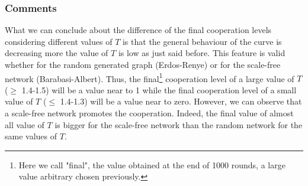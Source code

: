 \documentclass{article}
\begin{document}
\subsubsection{Comments}
What we can conclude about the difference of the final cooperation levels considering different values of $T$ is that the general behaviour of the curve is decreasing more the value of $T$ is low as just said before. This feature is valid whether for the random generated graph (Erdos-Renye) or for the scale-free network (Barabasi-Albert). Thus, the final\footnote{Here we call "final", the value obtained at the end of 1000 rounds, a large value arbitrary chosen previously.} cooperation level of a large value of $T$ ($\ge$ 1.4-1.5) will be a value near to 1 while the final cooperation level of a small value of $T$ ($\le$ 1.4-1.3) will be a value near to zero. However, we can observe that a scale-free network promotes the cooperation. Indeed, the final value of almost all value of $T$ is bigger for the scale-free network than the random network for the same values of $T$.  
\end{document}
